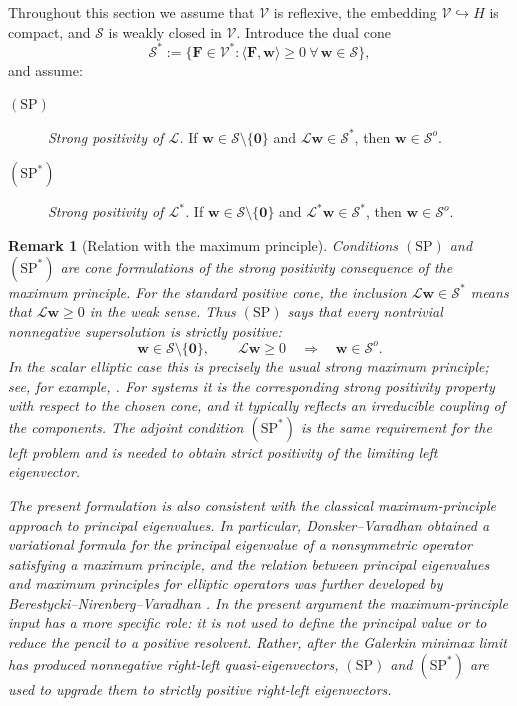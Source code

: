\documentclass[10pt,a4paper]{amsart}
\newtheorem{remark}{Remark}
\begin{document}
Throughout this section we assume that \(\mathcal V\) is reflexive, the
embedding \(\mathcal V\hookrightarrow H\) is compact, and \(\mathcal S\) is
weakly closed in \(\mathcal V\). Introduce the dual cone
\[
\mathcal S^*
:=
\{\mathbf F\in\mathcal V^*:
\langle\mathbf F,\mathbf w\rangle\ge0
\ \forall\,\mathbf w\in\mathcal S\},
\]
and assume:

\begin{description}
	\item[$\mathrm{(SP)}$] \emph{Strong positivity of \(\mathcal L\).}
	If \(\mathbf w\in\mathcal S\setminus\{\mathbf0\}\) and
	\(\mathcal L\mathbf w\in\mathcal S^*\), then
	\(\mathbf w\in\mathcal S^o\).
	
	\item[$\mathrm{(SP^*)}$] \emph{Strong positivity of \(\mathcal L^*\).}
	If \(\mathbf w\in\mathcal S\setminus\{\mathbf0\}\) and
	\(\mathcal L^*\mathbf w\in\mathcal S^*\), then
	\(\mathbf w\in\mathcal S^o\).
\end{description}

\begin{remark}[Relation with the maximum principle]
	Conditions \(\mathrm{(SP)}\) and \(\mathrm{(SP^*)}\) are cone formulations
	of the strong positivity consequence of the maximum principle. For the
	standard positive cone, the inclusion
	\(\mathcal L\mathbf w\in\mathcal S^*\) means that
	\(\mathcal L\mathbf w\ge0\) in the weak sense. Thus \(\mathrm{(SP)}\) says
	that every nontrivial nonnegative supersolution is strictly positive:
	\[
	\mathbf w\in\mathcal S\setminus\{\mathbf0\},
	\qquad
	\mathcal L\mathbf w\ge0
	\quad\Longrightarrow\quad
	\mathbf w\in\mathcal S^o .
	\]
	In the scalar elliptic case this is precisely the usual strong maximum
	principle; see, for example, \cite{ProtterWeinberger}. For systems it is the
	corresponding strong positivity property with respect to the chosen cone,
	and it typically reflects an irreducible coupling of the components. The
	adjoint condition \(\mathrm{(SP^*)}\) is the same requirement for the left
	problem and is needed to obtain strict positivity of the limiting left
	eigenvector.
	
	The present formulation is also consistent with the classical
	maximum-principle approach to principal eigenvalues. In particular,
	Donsker--Varadhan \cite{Donsker} obtained a variational formula for the
	principal eigenvalue of a nonsymmetric operator satisfying a maximum
	principle, and the relation between principal eigenvalues and maximum
	principles for elliptic operators was further developed by
	Berestycki--Nirenberg--Varadhan \cite{BerestNienbVardan}. In the present
	argument the maximum-principle input has a more specific role: it is not used
	to define the principal value or to reduce the pencil to a positive
	resolvent. Rather, after the Galerkin minimax limit has produced nonnegative
	right-left quasi-eigenvectors, \(\mathrm{(SP)}\) and \(\mathrm{(SP^*)}\) are
	used to upgrade them to strictly positive right-left eigenvectors.
\end{remark}
\end{document}

